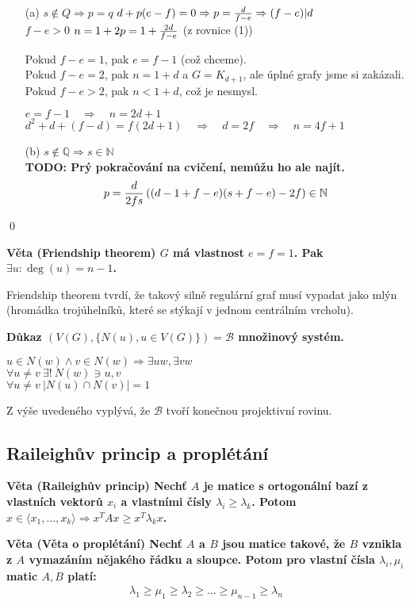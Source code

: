 \documentclass[a4paper,12pt,titlepage]{article}
\newcommand{\dk}{\smallskip\noindent\bf Důkaz\rm{} }
\newcommand{\vt}{\smallskip\noindent\bf Věta\rm{} }
\newcommand{\B}{\mathcal{B}}
\newcommand{\Q}{\mathbb{Q}}
\newcommand{\N}{\mathbb{N}}
\newcommand{\todo}[1]{\bf TODO: \rm#1}
\begin{document}
\begin{enumerate}
	\item[(a)] $s\not\in Q \Rightarrow p = q$ \quad $d + p(e-f) = 0 \Rightarrow p = {d\over f-e} \Rightarrow (f-e)|d$ \\
	$f-e > 0$ \quad $n = 1 + 2p = 1 + {2d\over f-e}$ \quad (z rovnice (1))

	Pokud $f-e = 1$, pak $e = f-1$ (což chceme). \\
	Pokud $f-e = 2$, pak $n = 1+d$ a $G = K_{d+1}$, ale úplné grafy jsme si zakázali. \\
	Pokud $f-e > 2$, pak $n < 1+d$, což je nesmysl.

	$e = f-1 \quad\Rightarrow\quad n = 2d+1$ \\
	$d^2 + d + (f-d) = f(2d+1) \quad\Rightarrow\quad d = 2f \quad\Rightarrow\quad n = 4f+1$

	\item[(b)] $s\not\in\Q\Rightarrow s\in\N$ \\
	\todo Prý pokračování na cvičení, nemůžu ho ale najít. \\
	$$p = {d\over 2fs}\left((d-1+f-e)(s+f-e)-2f\right) \in \N$$
\end{enumerate}
\qed


\vt (Friendship theorem) $G$ má vlastnost $e = f = 1$. Pak $\exists u: \deg(u) = n-1$.

Friendship theorem tvrdí, že takový silně regulární graf musí vypadat jako
mlýn (hromádka trojúhelníků, které se stýkají v jednom centrálním vrcholu).

\dk $(V(G), \{N(u), u\in V(G)\}) = \B$ množinový systém.

$u \in N(w) \wedge v \in N(w) \Rightarrow \exists uw, \exists vw$ \\
\indent $\forall u\neq v\ \exists!\ N(w) \ni u,v$ \\
\indent $\forall u\neq v\ |N(u)\cap N(v)| = 1$

Z výše uvedeného vyplývá, že $\B$ tvoří konečnou projektivní rovinu.

\subsection{Raileighův princip a proplétání}
\vt (Raileighův princip) Nechť $A$ je matice s ortogonální bazí z vlastních 
vektorů $x_i$ a vlastními čísly $\lambda_i \geq \lambda_k$. Potom $x \in\langle 
x_1,\dots,x_k\rangle \Rightarrow x^TAx\geq x^T\lambda_kx$.

\vt (Věta o proplétání) Nechť $A$ a $B$ jsou matice takové, že $B$ vznikla z $A$ 
vymazáním nějakého řádku a sloupce. Potom pro vlastní čísla $\lambda_i,\mu_i$ 
matic $A,B$ platí:
\begin{align}
	\lambda_1 \geq \mu_1 \geq \lambda_2 \geq \dots\geq \mu_{n-1} \geq \lambda_n
\end{align}
\end{document}
